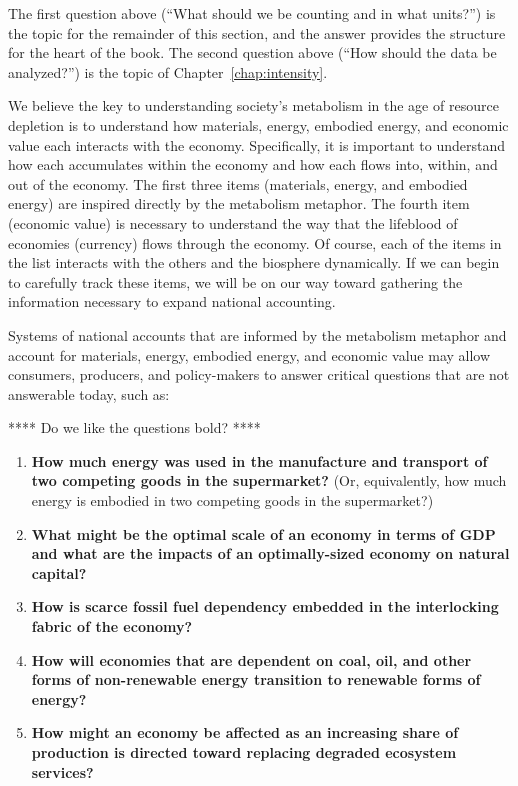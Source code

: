 The first question above (``What should we be counting and in what units?'') 
is the topic for the remainder of this section,
and the answer provides the structure for the heart of the book.
The second question above (``How should the data be analyzed?'')
is the topic of Chapter~\ref{chap:intensity}.

We believe the key to understanding society's metabolism
in the age of resource depletion is to understand how 
materials, energy, embodied energy, and economic value
each interacts with the economy.
Specifically, it is important to understand how each
accumulates within the economy and how each flows into, within, and out of the economy.
The first three items (materials, energy, and embodied energy) are
inspired directly by the metabolism metaphor.
The fourth item (economic value) is necessary to understand the way 
that the lifeblood of economies (currency) flows through the economy.
Of course, each of the items in the list interacts with the others 
and the biosphere dynamically.
If we can begin to carefully track these items, 
we will be on our way toward gathering the information necessary to 
expand national accounting.

Systems of national accounts that are informed by the metabolism metaphor 
and account for materials, energy, embodied energy, and economic value
may allow consumers, producers,
and policy-makers to answer critical questions that are not
answerable today, such as:

**** Do we like the questions bold? ****

\begin{enumerate}
	\item{\textbf{How much energy was used in the manufacture and transport
				of two competing goods in the supermarket?} 
				(Or, equivalently, how much energy is embodied 
				in two competing goods in the supermarket?)}
	\item{\textbf{What might be the optimal scale of an economy in terms of GDP 
				and what are the impacts of an optimally-sized economy on natural capital?}}
    \item{\textbf{How is scarce fossil fuel dependency embedded 
    			in the interlocking fabric of the economy?}} 
    \item{\textbf{How will economies that are dependent on coal, oil, 
     			and other forms of non-renewable energy transition 
    			to renewable forms of energy?}}
	\item{\textbf{How might an economy be affected as an increasing share of production
				is directed toward replacing 
				degraded ecosystem services?}~\cite[p.~221]{kummel2011}​}
\end{enumerate}

